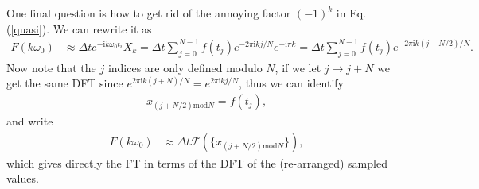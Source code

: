 \documentclass[11pt,letterpaper]{article}
\newcommand{\ii}{\mathrm{i}}
\newcommand{\eq}[1]{\begin{align}#1\end{align}}
\begin{document}
One final question is how to get rid of the annoying factor $(-1)^k$ in Eq. (\ref{quasi}). We can rewrite it as
\eq{
F(k \omega_0)&\approx \Delta t e^{-\ii k \omega_0 t_i} X_k=\Delta t \sum_{j=0}^{N-1} f(t_j) e^{-2 \pi \ii k  j/N} e^{-\ii \pi k }=\Delta t \sum_{j=0}^{N-1} f(t_j) e^{-2 \pi \ii k  (j+N/2)/N}.
}
Now note that the $j$ indices are only defined modulo $N$, if we let $j \to j+N$ we get the same DFT since $e^{2 \pi \ii k(j+N)/N}=e^{2 \pi \ii k j /N}$, thus we can identify
\eq{
x_{(j+N/2) \text{mod} N} = f(t_j),
} 
and write
\eq{
F(k \omega_0)&\approx \Delta t \mathcal{F}\left(\{x_{(j+N/2) \text{mod} N} \}\right),
}
which gives directly the FT in terms of the DFT of the (re-arranged) sampled values.
\end{document}
